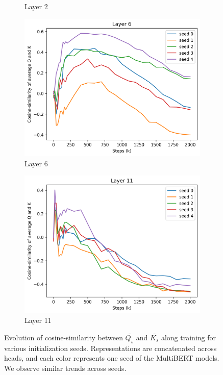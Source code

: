\begin{figure}[ht]
\begin{subfigure}[b]{0.24\linewidth}
         \caption{Layer 2}
         \label{fig:seeds_l2}
    \end{subfigure}
    \begin{subfigure}[b]{0.24\linewidth}
         \includegraphics[width=\linewidth]{sources/part_1/anisotropy/imgs/seeds_qk_l6.png}
         \caption{Layer 6}
         \label{fig:seeds_l6}
    \end{subfigure}
    \begin{subfigure}[b]{0.24\linewidth}
         \includegraphics[width=\linewidth]{sources/part_1/anisotropy/imgs/seeds_qk_l11.png}
         \caption{Layer 11}
         \label{fig:seeds_l11}
    \end{subfigure}
    \caption{Evolution of cosine-similarity between $\bar{Q_s}$ and $\bar{K_s}$ along training for various initialization seeds. Representations are concatenated across heads, and each color represents one seed of the MultiBERT models. We observe similar trends across seeds.}
    \label{fig:seeds_qk}
\end{figure}

